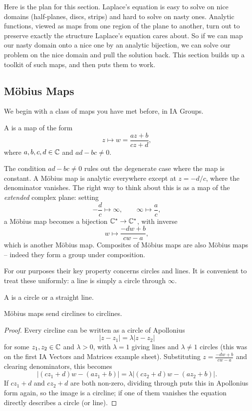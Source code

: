\documentclass[a4paper]{scrartcl}
\begin{document}
Here is the plan for this section. Laplace's equation is easy to solve on nice domains (half-planes, discs, strips) and hard to solve on nasty ones. Analytic functions, viewed as maps from one region of the plane to another, turn out to preserve exactly the structure Laplace's equation cares about. So if we can map our nasty domain onto a nice one by an analytic bijection, we can solve our problem on the nice domain and pull the solution back. This section builds up a toolkit of such maps, and then puts them to work.

\subsection{M\"obius Maps}

We begin with a class of maps you have met before, in IA Groups.

\begin{definition}
	A  is a map of the form
	$$
	z \mapsto w = \frac{az + b}{cz + d},
	$$
	where $a, b, c, d \in \mathbb{C}$ and $ad - bc \neq 0$.
\end{definition}

The condition $ad - bc \neq 0$ rules out the degenerate case where the map is constant. A M\"obius map is analytic everywhere except at $z = -d/c$, where the denominator vanishes. The right way to think about this is as a map of the \emph{extended} complex plane: setting
$$
-\frac{d}{c} \mapsto \infty, \qquad \infty \mapsto \frac{a}{c},
$$
a M\"obius map becomes a bijection $\mathbb{C}^* \to \mathbb{C}^*$, with inverse
$$
w \mapsto \frac{-dw + b}{cw - a},
$$
which is another M\"obius map. Composites of M\"obius maps are also M\"obius maps -- indeed they form a group under composition.

For our purposes their key property concerns circles and lines. It is convenient to treat these uniformly: a line is simply a circle through $\infty$.

\begin{definition}[Circline]
	A  is a circle or a straight line.
\end{definition}

\begin{proposition}
	M\"obius maps send circlines to circlines.
\end{proposition}
\begin{proof}
	Every circline can be written as a circle of Apollonius
	$$
	|z - z_1| = \lambda|z - z_2|
	$$
	for some $z_1, z_2 \in \mathbb{C}$ and $\lambda > 0$, with $\lambda = 1$ giving lines and $\lambda \neq 1$ circles (this was on the first IA Vectors and Matrices example sheet). Substituting $z = \frac{-dw+b}{cw - a}$ and clearing denominators, this becomes
	$$
	|(cz_1 + d)w - (az_1 + b)| = \lambda |(cz_2 + d)w - (az_2 + b)|.
	$$
	If $cz_1 + d$ and $cz_2 + d$ are both non-zero, dividing through puts this in Apollonius form again, so the image is a circline; if one of them vanishes the equation directly describes a circle (or line).
\end{proof}
\end{document}
